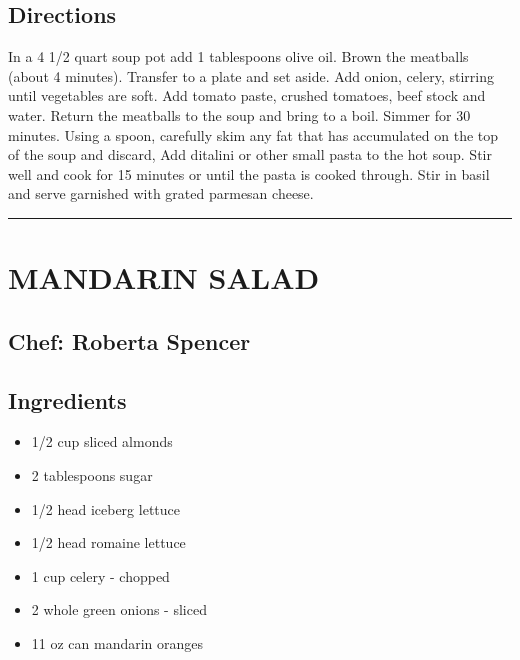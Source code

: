 \documentclass[
]{book}
\providecommand{\tightlist}{%
  \setlength{\itemsep}{0pt}\setlength{\parskip}{0pt}}
\begin{document}
\hypertarget{directions-19}{%
\subsection*{Directions}\label{directions-19}}


In a 4 1/2 quart soup pot add 1 tablespoons olive oil. Brown the meatballs
(about 4 minutes). Transfer to a plate and set aside. Add onion, celery, stirring until vegetables
are soft. Add tomato paste, crushed tomatoes, beef stock and water.
Return the meatballs to the soup and bring to a boil. Simmer for 30 minutes.
Using a spoon, carefully skim any fat that has accumulated on the top of the soup and discard,
Add ditalini or other small pasta to the hot soup.
Stir well and cook for 15 minutes or until the pasta is cooked through.
Stir in basil and serve garnished with grated parmesan cheese.

\begin{center}\rule{0.5\linewidth}{0.5pt}\end{center}

\hypertarget{mandarin-salad}{%
\section*{MANDARIN SALAD}\label{mandarin-salad}}


\hypertarget{chef-roberta-spencer-3}{%
\subsection*{Chef: Roberta Spencer}\label{chef-roberta-spencer-3}}


\hypertarget{ingredients-20}{%
\subsection*{Ingredients}\label{ingredients-20}}


\begin{itemize}
\tightlist
\item
  1/2 cup sliced almonds
\item
  2 tablespoons sugar
\item
  1/2 head iceberg lettuce
\item
  1/2 head romaine lettuce
\item
  1 cup celery - chopped
\item
  2 whole green onions - sliced
\item
  11 oz can mandarin oranges
\end{itemize}
\end{document}
